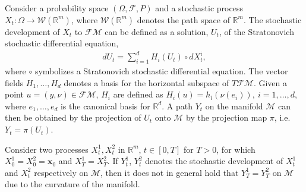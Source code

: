 \documentclass[runningheads,a4paper]{llncs}
\newcommand{\R}{\mathbb R}
\newcommand{\M}{\mathcal{M}}
\newcommand{\FM}{\mathcal{FM}}
\begin{document}
Consider a probability space $(\Omega,\mathcal{F},P)$ and a stochastic process $X_t\colon\Omega\to \mathcal{W}(\R^m)$, where $\mathcal{W}(\R^m)$ denotes the path space of $\R^m$. The stochastic development of $X_t$ to $\FM$ can be defined as a solution, $U_t$, of the Stratonovich stochastic differential equation,
\begin{align}
	dU_t = \sum_{i=1}^d H_i(U_t)\circ dX^i_{t},
\label{eq:stocDev}
\end{align}
where $\circ$ symbolizes a Stratonovich stochastic differential equation. The vector fields $H_1,\ldots,H_d$ denotes a basis for the horizontal subspace of $T\FM$. Given a point $u = (y,\nu)\in\FM$, $H_i$ are defined as $H_i(u) = h_l(\nu(e_i)), \ i = 1,\ldots,d$, where $e_1,\ldots,e_d$ is the canonical basis for $\R^d$.
 A path $Y_t$ on the manifold $\M$ can then be obtained by the projection of $U_t$ onto $\M$ by the projection map $\pi$, i.e. $Y_t = \pi(U_t)$.

Consider two processes $X^1_t,X^2_t$ in $\R^m$, $t\in [0,T]$ for $T > 0$, for which $X^1_0 = X^2_0 = \boldsymbol{x}_0$ and $X^1_T = X_T^2$. If $Y^1_t$, $Y^2_t$ denotes the stochastic development of $X^1_t$ and $X^2_t$ respectively on $\mathcal{M}$, then it does not in general hold that $Y^1_T = Y^2_T$ on $\M$ due to the curvature of the manifold.
\end{document}
